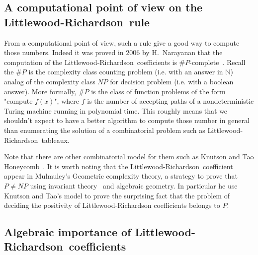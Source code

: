 \documentclass[12pt,a4paper]{article}
\newcommand{\LR}{Littlewood-Richardson\ }
\newcommand{\N}{{\mathbb N}}
\begin{document}
\subsection{A computational point of view on the \LR rule}

From a computational point of view, such a rule give a good way to compute
those numbers. Indeed it was proved in 2006 by H.~Narayanan that the
computation of the \LR coefficients is
$\#P$-complete~\cite{Narayanan06}. Recall the $\#P$ is the complexity class
counting problem (i.e. with an answer in $\N$) analog of the complexity class
$NP$ for decision problem (i.e. with a boolean answer). More formally, $\#P$
is the class of function problems of the form "compute $f(x)$", where $f$ is
the number of accepting paths of a nondeterministic Turing machine running in
polynomial time. This roughly means that we shouldn't expect to have a better
algorithm to compute those number in general than enumerating the solution of
a combinatorial problem such as \LR tableaux.

Note that there are other combinatorial model for them such as Knutson and Tao
Honeycomb~\cite{KnutsonTao}. It is worth noting that the \LR coefficient
appear in Mulmuley's Geometric complexity theory, a strategy to prove that
$P\neq NP$ using invariant theory~\cite{Mulmuley} and algebraic geometry. In
particular he use Knutson and Tao's model to prove the surprising fact that
the problem of deciding the positivity of Littlewood-Richardson coefficients
belongs to $P$.


\subsection{Algebraic importance of \LR coefficients}
\end{document}
